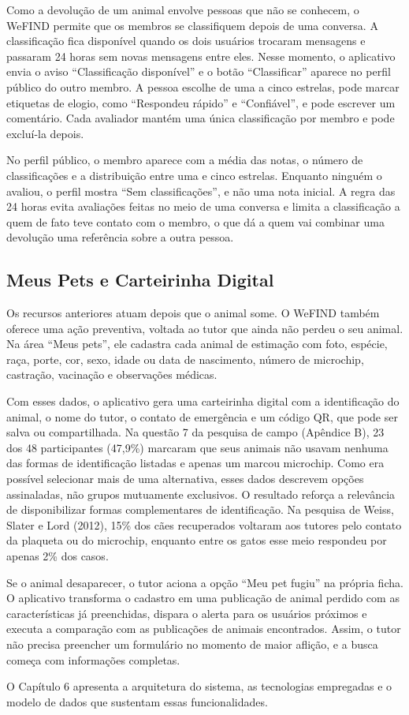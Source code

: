 Como a devolução de um animal envolve pessoas que não se conhecem, o WeFIND permite que os membros se classifiquem depois de uma conversa. A classificação fica disponível quando os dois usuários trocaram mensagens e passaram 24 horas sem novas mensagens entre eles. Nesse momento, o aplicativo envia o aviso ``Classificação disponível'' e o botão ``Classificar'' aparece no perfil público do outro membro. A pessoa escolhe de uma a cinco estrelas, pode marcar etiquetas de elogio, como ``Respondeu rápido'' e ``Confiável'', e pode escrever um comentário. Cada avaliador mantém uma única classificação por membro e pode excluí-la depois.

No perfil público, o membro aparece com a média das notas, o número de classificações e a distribuição entre uma e cinco estrelas. Enquanto ninguém o avaliou, o perfil mostra ``Sem classificações'', e não uma nota inicial. A regra das 24 horas evita avaliações feitas no meio de uma conversa e limita a classificação a quem de fato teve contato com o membro, o que dá a quem vai combinar uma devolução uma referência sobre a outra pessoa.

\subsection{Meus Pets e Carteirinha Digital}\label{sec:meus_pets}

Os recursos anteriores atuam depois que o animal some. O WeFIND também oferece uma ação preventiva, voltada ao tutor que ainda não perdeu o seu animal. Na área ``Meus pets'', ele cadastra cada animal de estimação com foto, espécie, raça, porte, cor, sexo, idade ou data de nascimento, número de microchip, castração, vacinação e observações médicas.

Com esses dados, o aplicativo gera uma carteirinha digital com a identificação do animal, o nome do tutor, o contato de emergência e um código QR, que pode ser salva ou compartilhada. Na questão 7 da pesquisa de campo (Apêndice B), 23 dos 48 participantes (47,9\%) marcaram que seus animais não usavam nenhuma das formas de identificação listadas e apenas um marcou microchip. Como era possível selecionar mais de uma alternativa, esses dados descrevem opções assinaladas, não grupos mutuamente exclusivos. O resultado reforça a relevância de disponibilizar formas complementares de identificação. Na pesquisa de Weiss, Slater e Lord (2012), 15\% dos cães recuperados voltaram aos tutores pelo contato da plaqueta ou do microchip, enquanto entre os gatos esse meio respondeu por apenas 2\% dos casos.

Se o animal desaparecer, o tutor aciona a opção ``Meu pet fugiu'' na própria ficha. O aplicativo transforma o cadastro em uma publicação de animal perdido com as características já preenchidas, dispara o alerta para os usuários próximos e executa a comparação com as publicações de animais encontrados. Assim, o tutor não precisa preencher um formulário no momento de maior aflição, e a busca começa com informações completas.

O Capítulo 6 apresenta a arquitetura do sistema, as tecnologias empregadas e o modelo de dados que sustentam essas funcionalidades.
